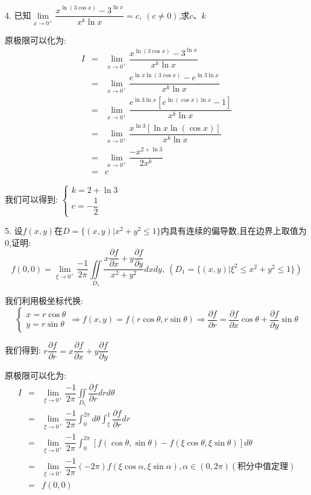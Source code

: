 4. 已知$\lim\limits_{x\rightarrow 0^{+}}\dfrac{x^{\ln (3\cos x)}-3^{\ln x}}{x^k\ln x}=c,\ (c\neq 0)$,求$c$、$k$
\begin{solution}

	原极限可以化为:  
	\begin{eqnarray*}
		I&=&\lim\limits_{x\rightarrow 0^{+}}\dfrac{x^{\ln (3\cos x)}-3^{\ln x}}{x^k\ln x}\\
		&=&\lim\limits_{x\rightarrow 0^{+}}\dfrac{e^{\ln x\ln (3\cos x)}-e^{\ln3\ln x}}{x^k\ln x}\\
		&=&\lim\limits_{x\rightarrow 0^{+}}\dfrac{e^{\ln3\ln x}[e^{\ln(\cos x)\ln x}-1]}{x^k\ln x}\\
		&=&\lim\limits_{x\rightarrow 0^{+}}\dfrac{x^{\ln3}[\ln x\ln(\cos x)]}{x^k\ln x}\\
		&=&\lim\limits_{x\rightarrow 0^{+}}\dfrac{-x^{2+\ln3}}{2x^k}\\
		&=&c
	\end{eqnarray*}
	
	我们可以得到:  $\left\lbrace
	\begin{array}{l}
		k=2+\ln3\\
		c=-\dfrac{1}{2}
	\end{array}
	\right. $
\end{solution}

5. 设$f(x,y)$在$D=\{(x,y)|x^2+y^2\leq 1\}$内具有连续的偏导数,且在边界上取值为$0$,证明:  
$$f(0,0)=\lim\limits_{\xi\rightarrow 0^{+}}\dfrac{-1}{2\pi}\iint\limits_{D_{1}}\dfrac{x\dfrac{\partial f}{\partial x}+y\dfrac{\partial f}{\partial y}}{x^2+y^2}dxdy,\ (D_{1}=\{(x,y)|\xi^{2}\leq x^2+y^2\leq 1\})$$
\begin{solution}

	我们利用极坐标代换:  
	$$\left\lbrace
	\begin{array}{l}
		x=r\cos\theta\\
		y=r\sin\theta
	\end{array}
	\right. \Rightarrow f(x,y)=f(r\cos\theta,r\sin\theta)\Rightarrow \dfrac{\partial f}{\partial r}=\dfrac{\partial f}{\partial x}\cos\theta+\dfrac{\partial f}{\partial y}\sin\theta$$
	
	我们得到:  $r\dfrac{\partial f}{\partial r}=x\dfrac{\partial f}{\partial x}+y\dfrac{\partial f}{\partial y}$
	
	原极限可以化为:  
	\begin{eqnarray*}
		I&=&\lim\limits_{\xi\rightarrow 0^{+}}\dfrac{-1}{2\pi}\iint\limits_{D_{1}}\dfrac{\partial f}{\partial r}drd\theta\\
		&=&\lim\limits_{\xi\rightarrow 0^{+}}\dfrac{-1}{2\pi}\int_{0}^{2\pi}d\theta\int_{\xi}^{1}\dfrac{\partial f}{\partial r}dr\\
		&=&\lim\limits_{\xi\rightarrow 0^{+}}\dfrac{-1}{2\pi}\int_{0}^{2\pi}[f(\cos\theta,\sin\theta)-f(\xi\cos\theta,\xi\sin\theta)]d\theta\\
		&=&\lim\limits_{\xi\rightarrow 0^{+}}\dfrac{-1}{2\pi}(-2\pi)f(\xi\cos\alpha,\xi\sin\alpha),\alpha\in(0,2\pi)(\text{积分中值定理})\\
		&=&f(0,0)
	\end{eqnarray*}
\end{solution}

